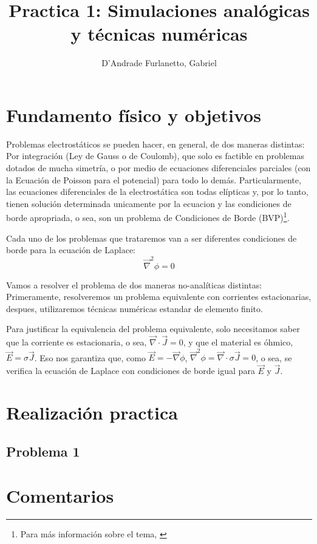 \documentclass[a4paper,12pt]{article}
\begin{document}
\title{Practica 1: Simulaciones analógicas y técnicas numéricas}
\author{D'Andrade Furlanetto, Gabriel}
\maketitle

\section{Fundamento físico y objetivos}
Problemas electrostáticos se pueden hacer, en general, de dos maneras distintas: Por integración (Ley de Gauss o de Coulomb), que solo es factible en problemas dotados de mucha simetría, o por medio de ecuaciones diferenciales parciales (con la Ecuación de Poisson para el potencial) para todo lo demás. Particularmente, las ecuaciones diferenciales de la electrostática son todas elípticas y, por lo tanto, tienen solución determinada unicamente por la ecuacion y las condiciones de borde apropriada, o sea, son un problema de Condiciones de Borde (BVP)\footnote{Para más información sobre el tema, \cite[]{PDEs}}.

Cada uno de los problemas que trataremos van a ser diferentes condiciones de borde para la ecuación de Laplace:
$$\vec{\nabla}^2 \phi = 0 $$

Vamos a resolver el problema de dos maneras no-analíticas distintas: Primeramente, resolveremos un problema equivalente con corrientes estacionarias, despues, utilizaremos técnicas numéricas estandar de elemento finito. 

Para justificar la equivalencia del problema equivalente, solo necesitamos saber que la corriente es estacionaria, o sea, $\vec{\nabla} \cdot \vec{J} = 0$, y que el material es óhmico, $\vec{E} = \sigma \vec{J}$. Eso nos garantiza que, como $\vec{E} = -\vec{\nabla} \phi$, $\vec{\nabla}^2 \phi = \vec{\nabla} \cdot \sigma \vec{J}=0$, o sea, se verifica la ecuación de Laplace con condiciones de borde igual para $\vec{E}$ y $\vec{J}$.
\section{Realización practica}
\subsection{Problema 1}
\section{Comentarios}
\end{document}
